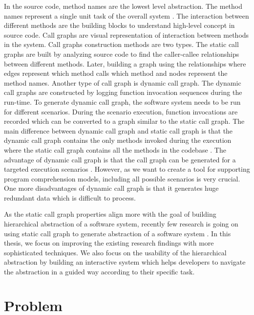 In the source code, method names are the lowest level abstraction. The method names represent a single unit task of the overall system \cite{de2012using, starke2009searching}. The interaction between different methods are the building blocks to understand high-level concept in source code. Call graphs are visual representation of interaction between methods in the system. Call graphs construction methods are two types. The static call graphs are built by analyzing source code to find the caller-callee relationships between different methods. Later, building a graph using the relationships where edges represent which method calls which method and nodes represent the method names. Another type of call graph is dynamic call graph. The dynamic call graphs are constructed by logging function invocation sequences during the run-time. To generate dynamic call graph, the software system needs to be run for different scenarios. During the scenario execution, function invocations are recorded which can be converted to a graph similar to the static call graph. The main difference between dynamic call graph and static call graph is that the dynamic call graph contains the only methods invoked during the execution where the static call graph contains all the methods in the codebase \cite{gharibi2018automaticStaticCluster}. The advantage of dynamic call graph is that the call graph can be generated for a targeted execution scenarios \cite{feng2018hierarchicalExecutionComprehension}. However, as we want to create a tool for supporting program comprehension models, including all possible scenarios is very crucial. One more disadvantages of dynamic call graph is that it generates huge redundant data which is difficult to process. 

As the static call graph properties align more with the goal of building hierarchical abstraction of a software system, recently few research is going on using static call graph to generate abstraction of a software system \cite{gharibi2018automaticStaticCluster, walunj2019graphevoEvolutionCall}. In this thesis, we focus on improving the existing research findings with more sophisticated techniques. We also focus on the usability of the hierarchical abstraction by building an interactive system which helps developers to navigate the abstraction in a guided way according to their specific task. 

 
\newpage


\section{Problem }


